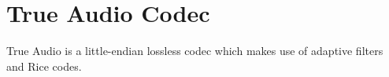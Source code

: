 
\chapter{True Audio Codec}
True Audio is a little-endian lossless codec
which makes use of adaptive filters and Rice codes.



\clearpage


